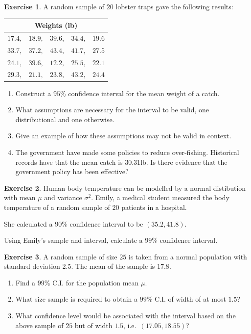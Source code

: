\documentclass[
]{book}
\theoremstyle{definition}
\theoremstyle{definition}
\theoremstyle{definition}
\newtheorem{exercise}{Exercise}[chapter]
\theoremstyle{definition}
\theoremstyle{remark}
\begin{document}
\begin{exercise}

A random sample of \(20\) lobster traps gave the following results:

\begin{longtable}[]{@{}c@{}}
\toprule
Weights (lb)\tabularnewline
\midrule
\endhead
\(17.4, \ \ \ \  18.9, \ \ \ \ 39.6, \ \ \ \ 34.4, \ \ \ \  19.6\)\tabularnewline
\(33.7 , \ \ \ \  37.2, \ \ \ \  43.4, \ \ \ \  41.7, \ \ \ \  27.5\)\tabularnewline
\(24.1, \ \ \ \  39.6, \ \ \ \  12.2, \ \ \ \  25.5, \ \ \ \  22.1\)\tabularnewline
\(29.3, \ \ \ \  21.1, \ \ \ \  23.8, \ \ \ \  43.2, \ \ \ \  24.4\)\tabularnewline
\bottomrule
\end{longtable}

\begin{enumerate}
\def\labelenumi{\alph{enumi})}
\item
  Construct a \(95\%\) confidence interval for the mean weight of a catch.
\item
  What assumptions are necessary for the interval to be valid, one distributional and one otherwise.
\item
  Give an example of how these assumptions may not be valid in context.
\item
  The government have made some policies to reduce over-fishing. Historical records have that the mean catch is \(30.31\)lb. Is there evidence that the government policy has been effective?
\end{enumerate}

\end{exercise}

\begin{exercise}
Human body temperature can be modelled by a normal distibution with mean \(\mu\) and variance \(\sigma^2\). Emily, a medical student measured the body temperature of a random sample of \(20\) patients in a hospital.

She calculated a \(90\%\) confidence interval to be \((35.2,41.8)\).

Using Emily's sample and interval, calculate a \(99\%\) confidence interval.
\end{exercise}

\begin{exercise}

A random sample of size \(25\) is taken from a normal population with standard deviation \(2.5\).
The mean of the sample is \(17.8\).

\begin{enumerate}
\def\labelenumi{\alph{enumi}.}
\item
  Find a \(99\%\) C.I. for the population mean \(\mu\).
\item
  What size sample is required to obtain a \(99\%\) C.I. of width of at most \(1.5\)?
\item
  What confidence level would be associated with the interval based on the above sample of \(25\) but of width \(1.5\), i.e.~\((17.05, 18.55)\)?
\end{enumerate}

\end{exercise}
\end{document}

